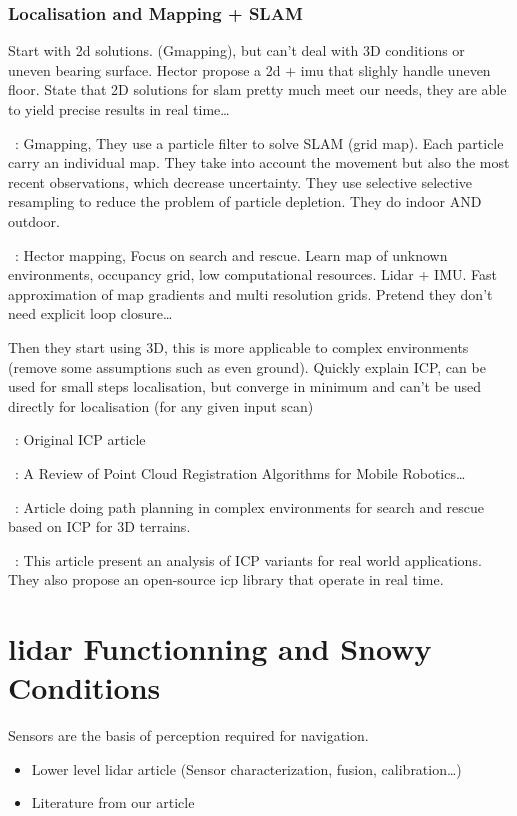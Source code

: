\subsubsection{Localisation and Mapping + SLAM}
Start with 2d solutions. (Gmapping), but can't deal with 3D conditions or uneven bearing surface. Hector propose a 2d + imu that slighly handle uneven floor.
State that 2D solutions for slam pretty much meet our needs, they are able to yield precise results in real time\dots

~\cite{Grisetti2007}: Gmapping,
They use a particle filter to solve SLAM (grid map). Each particle carry an individual map. They take into account the movement but also the most recent observations, which decrease uncertainty. They use selective selective resampling to reduce the problem of particle depletion. They do indoor AND outdoor. 

~\cite{Kohlbrecher2011}: Hector mapping,
Focus on search and rescue. Learn map of unknown environments, occupancy grid, low computational resources. Lidar + IMU. Fast approximation of map gradients and multi resolution grids. Pretend they don't need explicit loop closure\dots


Then they start using 3D, this is more applicable to complex environments (remove some assumptions such as even ground).
Quickly explain ICP, can be used for small steps localisation, but converge in minimum and can't be used directly for localisation (for any given input scan)

~\cite{Besl1992}:
Original ICP article

~\cite{Pomerleau2015a}:
A Review of Point Cloud Registration Algorithms for Mobile Robotics\dots

~\cite{Colas2013}:
Article doing path planning in complex environments for search and rescue based on ICP for 3D terrains. 

~\cite{Pomerleau2013}:
This article present an analysis of ICP variants for real world applications. They also propose an open-source icp library that operate in real time.  


\section{\gls*{lidar} Functionning and Snowy Conditions}
\label{sec:literature_snow}

Sensors are the basis of perception required for navigation. 
\begin{itemize}
    \item Lower level lidar article (Sensor characterization, fusion, calibration\dots) 
    \item Literature from our article
\end{itemize}

